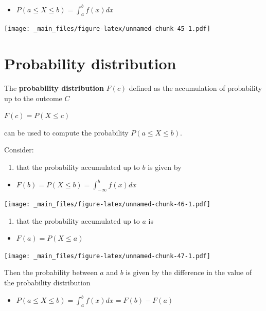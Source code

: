 \documentclass[
]{book}
\providecommand{\tightlist}{%
  \setlength{\itemsep}{0pt}\setlength{\parskip}{0pt}}
\begin{document}
\begin{itemize}
\tightlist
\item
  \(P(a \leq X \leq b) = \int_{a}^{b} f(x) dx\)
\end{itemize}

\texttt{[image: \_main\_files/figure-latex/unnamed-chunk-45-1.pdf]}

\hypertarget{probability-distribution-1}{%
\section{Probability distribution}\label{probability-distribution-1}}

The \textbf{probability distribution} \(F(c)\) defined as the accumulation of probability up to the outcome \(C\)

\(F(c) = P(X \leq c)\)

can be used to compute the probability \(P(a \leq X \leq b)\).

Consider:

\begin{enumerate}
\def\labelenumi{\arabic{enumi})}
\tightlist
\item
  that the probability accumulated up to \(b\) is given by
\end{enumerate}

\begin{itemize}
\tightlist
\item
  \(F(b) = P(X \leq b)=\int_{-\infty}^bf(x)dx\)
\end{itemize}

\texttt{[image: \_main\_files/figure-latex/unnamed-chunk-46-1.pdf]}

\begin{enumerate}
\def\labelenumi{\arabic{enumi})}
\setcounter{enumi}{1}
\tightlist
\item
  that the probability accumulated up to \(a\) is
\end{enumerate}

\begin{itemize}
\tightlist
\item
  \(F(a) = P(X \leq a)\)
\end{itemize}

\texttt{[image: \_main\_files/figure-latex/unnamed-chunk-47-1.pdf]}

Then the probability between \(a\) and \(b\) is given by the difference in the value of the probability distribution

\begin{itemize}
\tightlist
\item
  \(P(a\leq X \leq b) = \int_a^b f(x)dx=F(b)-F(a)\)
\end{itemize}
\end{document}
